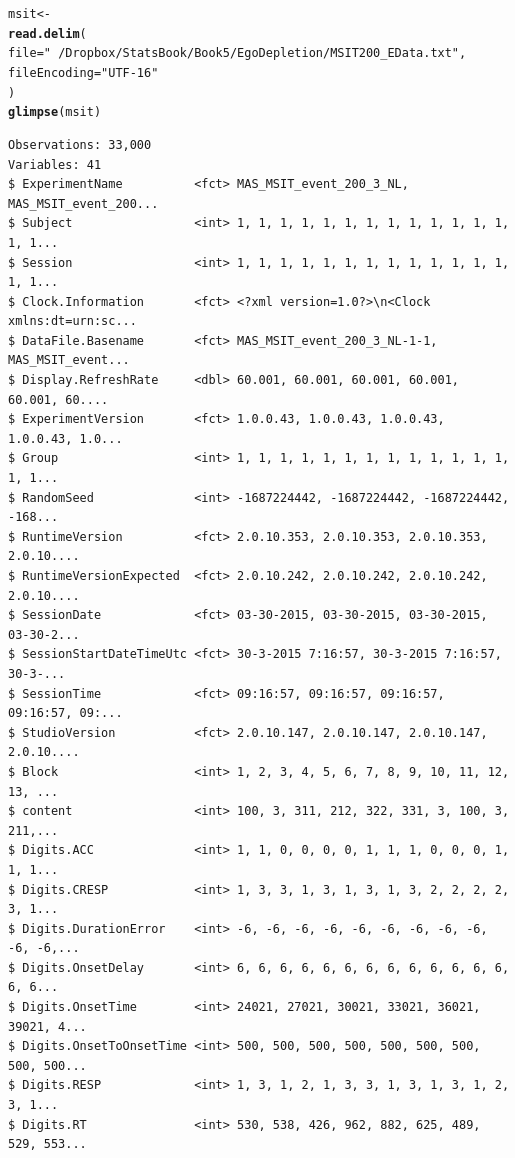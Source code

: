 \documentclass{article}\usepackage[]{graphicx}\usepackage[]{color}
\makeatletter
\newcommand{\hlstr}[1]{\textcolor[rgb]{0.192,0.494,0.8}{#1}}%
\newcommand{\hlstd}[1]{\textcolor[rgb]{0.345,0.345,0.345}{#1}}%
\newcommand{\hlkwb}[1]{\textcolor[rgb]{0.69,0.353,0.396}{#1}}%
\newcommand{\hlkwc}[1]{\textcolor[rgb]{0.333,0.667,0.333}{#1}}%
\newcommand{\hlkwd}[1]{\textcolor[rgb]{0.737,0.353,0.396}{\textbf{#1}}}%
\newenvironment{kframe}{%
 \def\at@end@of@kframe{}%
 \ifinner\ifhmode%
  \def\at@end@of@kframe{\end{minipage}}%
  \begin{minipage}{\columnwidth}%
 \fi\fi%
 \def\FrameCommand##1{\hskip\@totalleftmargin \hskip-\fboxsep
 \colorbox{shadecolor}{##1}\hskip-\fboxsep
     \hskip-\linewidth \hskip-\@totalleftmargin \hskip\columnwidth}%
 \MakeFramed {\advance\hsize-\width
   \@totalleftmargin\z@ \linewidth\hsize
   \@setminipage}}%
 {\par\unskip\endMakeFramed%
 \at@end@of@kframe}
\newenvironment{knitrout}{}{} %
\makeatother
\begin{document}
\begin{knitrout}\footnotesize
{}\color{fgcolor}\begin{kframe}
\begin{alltt}
\hlstd{msit} \hlkwb{<-}
  \hlkwd{read.delim}\hlstd{(}
    \hlkwc{file} \hlstd{=} \hlstr{"~/Dropbox/StatsBook/Book5/EgoDepletion/MSIT200_EData.txt"}\hlstd{,}
    \hlkwc{fileEncoding} \hlstd{=} \hlstr{"UTF-16"}
  \hlstd{)}
\hlkwd{glimpse}\hlstd{(msit)}
\end{alltt}
\begin{verbatim}
Observations: 33,000
Variables: 41
$ ExperimentName          <fct> MAS_MSIT_event_200_3_NL, MAS_MSIT_event_200...
$ Subject                 <int> 1, 1, 1, 1, 1, 1, 1, 1, 1, 1, 1, 1, 1, 1, 1...
$ Session                 <int> 1, 1, 1, 1, 1, 1, 1, 1, 1, 1, 1, 1, 1, 1, 1...
$ Clock.Information       <fct> <?xml version=1.0?>\n<Clock xmlns:dt=urn:sc...
$ DataFile.Basename       <fct> MAS_MSIT_event_200_3_NL-1-1, MAS_MSIT_event...
$ Display.RefreshRate     <dbl> 60.001, 60.001, 60.001, 60.001, 60.001, 60....
$ ExperimentVersion       <fct> 1.0.0.43, 1.0.0.43, 1.0.0.43, 1.0.0.43, 1.0...
$ Group                   <int> 1, 1, 1, 1, 1, 1, 1, 1, 1, 1, 1, 1, 1, 1, 1...
$ RandomSeed              <int> -1687224442, -1687224442, -1687224442, -168...
$ RuntimeVersion          <fct> 2.0.10.353, 2.0.10.353, 2.0.10.353, 2.0.10....
$ RuntimeVersionExpected  <fct> 2.0.10.242, 2.0.10.242, 2.0.10.242, 2.0.10....
$ SessionDate             <fct> 03-30-2015, 03-30-2015, 03-30-2015, 03-30-2...
$ SessionStartDateTimeUtc <fct> 30-3-2015 7:16:57, 30-3-2015 7:16:57, 30-3-...
$ SessionTime             <fct> 09:16:57, 09:16:57, 09:16:57, 09:16:57, 09:...
$ StudioVersion           <fct> 2.0.10.147, 2.0.10.147, 2.0.10.147, 2.0.10....
$ Block                   <int> 1, 2, 3, 4, 5, 6, 7, 8, 9, 10, 11, 12, 13, ...
$ content                 <int> 100, 3, 311, 212, 322, 331, 3, 100, 3, 211,...
$ Digits.ACC              <int> 1, 1, 0, 0, 0, 0, 1, 1, 1, 0, 0, 0, 1, 1, 1...
$ Digits.CRESP            <int> 1, 3, 3, 1, 3, 1, 3, 1, 3, 2, 2, 2, 2, 3, 1...
$ Digits.DurationError    <int> -6, -6, -6, -6, -6, -6, -6, -6, -6, -6, -6,...
$ Digits.OnsetDelay       <int> 6, 6, 6, 6, 6, 6, 6, 6, 6, 6, 6, 6, 6, 6, 6...
$ Digits.OnsetTime        <int> 24021, 27021, 30021, 33021, 36021, 39021, 4...
$ Digits.OnsetToOnsetTime <int> 500, 500, 500, 500, 500, 500, 500, 500, 500...
$ Digits.RESP             <int> 1, 3, 1, 2, 1, 3, 3, 1, 3, 1, 3, 1, 2, 3, 1...
$ Digits.RT               <int> 530, 538, 426, 962, 882, 625, 489, 529, 553...

\end{verbatim}
\end{kframe}
\end{knitrout}
\end{document}
